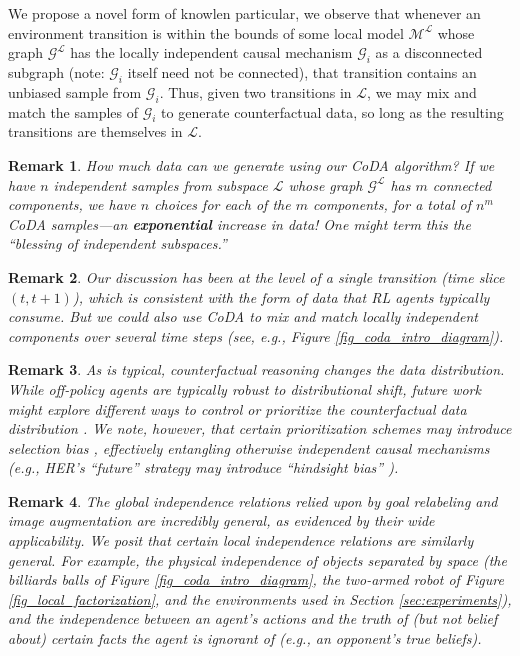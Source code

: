 \documentclass{article}
\newcommand{\M}{\mathcal{M}}
\renewcommand{\L}{\mathcal{L}}
\newcommand{\G}{\mathcal{G}}
\newtheorem{remark}{Remark}[section]
\begin{document}
We propose a novel form of knowlen particular, we observe that whenever an environment transition is within the bounds of some local model $\M^\L$ whose graph $\G^\L$ has the locally independent causal mechanism $\G_i$ as a disconnected subgraph (note: $\G_i$ itself need not be connected), that transition contains an unbiased sample from $\G_i$. Thus, 
given two transitions in $\L$, 
we may mix and match the samples of $\G_i$ to generate counterfactual data, 
so long as the resulting transitions are themselves in $\L$. 

\begin{remark} How much data can we generate using our CoDA algorithm? If we have $n$ independent samples from subspace $\L$ whose graph $\G^\L$ has $m$ connected components, we have $n$ choices for each of the $m$ components, for a total of $n^m$ CoDA samples---an \textbf{exponential} increase in data! One might term this the ``blessing of independent subspaces.''
\end{remark}
\begin{remark} Our discussion has been at the level of a single transition (time slice $(t, t+1)$), which is consistent with the form of data that RL agents typically consume. But we could also use CoDA to mix and match locally independent components over several time steps (see, e.g., Figure \ref{fig_coda_intro_diagram}).
\end{remark}
\begin{remark} \label{remark_distributional_shift} As is typical, counterfactual reasoning changes the data distribution. While off-policy agents are typically robust to distributional shift, future work might explore different ways to control or prioritize the counterfactual data distribution \cite{schaul2015prioritized,kumar2020discor}. We note, however, that certain prioritization schemes may introduce selection bias \cite{hernan2020causal}, effectively entangling otherwise independent causal mechanisms (e.g., HER's ``future'' strategy \cite{andrychowicz2017hindsight} may introduce ``hindsight bias'' \cite{lanka2018archer,schroecker2020universal}).
\end{remark}
\begin{remark} The global independence relations relied upon by goal relabeling and image augmentation are incredibly general, as evidenced by their wide applicability. We posit that certain local independence relations are similarly general. For example, the physical independence of objects separated by space (the billiards balls of Figure \ref{fig_coda_intro_diagram}, the two-armed robot of Figure \ref{fig_local_factorization}, and the environments used in Section \ref{sec:experiments}), and the independence between an agent's actions and the truth of (but not belief about) certain facts the agent is ignorant of (e.g., an opponent's true beliefs).
\end{remark}
\end{document}

